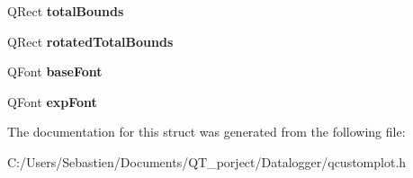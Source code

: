 \begin{DoxyCompactItemize}
Q\+Rect {\bfseries total\+Bounds}
\item 
\mbox{\label{struct_q_c_p_axis_painter_private_1_1_tick_label_data_aa4d38c5ea47c9184a78ee33ae7f1012e}} 
Q\+Rect {\bfseries rotated\+Total\+Bounds}
\item 
\mbox{\label{struct_q_c_p_axis_painter_private_1_1_tick_label_data_a0d4958a706debaa8d19a9b65fc090d56}} 
Q\+Font {\bfseries base\+Font}
\item 
\mbox{\label{struct_q_c_p_axis_painter_private_1_1_tick_label_data_adc10767ebcb719d6927c012a38b9d933}} 
Q\+Font {\bfseries exp\+Font}
\end{DoxyCompactItemize}


The documentation for this struct was generated from the following file\+:\begin{DoxyCompactItemize}
\item 
C\+:/\+Users/\+Sebastien/\+Documents/\+Q\+T\+\_\+porject/\+Datalogger/qcustomplot.\+h\end{DoxyCompactItemize}
